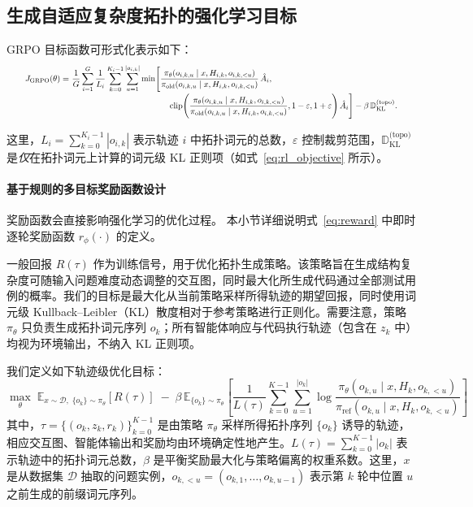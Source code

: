 \documentclass{article}
\theoremstyle{definition}
\begin{document}
\subsection{生成自适应复杂度拓扑的强化学习目标}
\label{appendix:rl_funs}
GRPO 目标函数可形式化表示如下：
\begin{equation}\label{eq:grpo_obj_fit}
\resizebox{0.95\linewidth}{!}{$
\begin{aligned}
J_{\mathrm{GRPO}}(\theta)=&\ \frac{1}{G}\sum_{i=1}^{G}\frac{1}{L_i}
\sum_{k=0}^{K_i-1}\sum_{u=1}^{|o_{i,k}|}
\min\!\Bigg[
\frac{\pi_\theta\!\left(o_{i,k,u}\mid x,H_{i,k},o_{i,k,<u}\right)}
     {\pi_{\text{old}}\!\left(o_{i,k,u}\mid x,H_{i,k},o_{i,k,<u}\right)}\,\hat A_i,\ 
\\[-2pt]
&\hspace{4.2cm}
\operatorname{clip}\!\Bigg(
\frac{\pi_\theta\!\left(o_{i,k,u}\mid x,H_{i,k},o_{i,k,<u}\right)}
     {\pi_{\text{old}}\!\left(o_{i,k,u}\mid x,H_{i,k},o_{i,k,<u}\right)},
1-\varepsilon,1+\varepsilon\Bigg)\,\hat A_i
\Bigg] 
-\beta\,\mathbb D_{\mathrm{KL}}^{\text{(topo)}}.
\end{aligned}
$}
\end{equation}

这里，$L_i=\sum_{k=0}^{K_i-1}|o_{i,k}|$ 表示轨迹 $i$ 中拓扑词元的总数，$\varepsilon$ 控制裁剪范围，$\mathbb D_{\mathrm{KL}}^{\text{(topo)}}$ 是\emph{仅}在拓扑词元上计算的词元级 KL 正则项（如式~\ref{eq:rl_objective} 所示）。
\paragraph{基于规则的多目标奖励函数设计}
奖励函数会直接影响强化学习的优化过程。
本小节详细说明式~\ref{eq:reward} 中即时逐轮奖励函数
\(r_\phi(\cdot)\) 的定义。

一般回报 $R(\tau)$ 作为训练信号，用于优化拓扑生成策略。该策略旨在生成结构复杂度可随输入问题难度动态调整的交互图，同时最大化所生成代码通过全部测试用例的概率。我们的目标是最大化从当前策略采样所得轨迹的期望回报，同时使用词元级 Kullback--Leibler（KL）散度相对于参考策略进行正则化。需要注意，策略 $\pi_\theta$ 只负责生成拓扑词元序列 $o_k$；所有智能体响应与代码执行轨迹（包含在 $z_k$ 中）均视为环境输出，不纳入 KL 正则项。

我们定义如下轨迹级优化目标：
\begin{equation}\label{eq:rl_objective}
\max_{\theta} \; \mathbb{E}_{x \sim \mathcal{D},\; \{o_k\} \sim \pi_\theta}\! \left[ R(\tau) \right] 
\; - \; \beta \, \mathbb{E}_{\{o_k\} \sim \pi_\theta}\! \left[ \frac{1}{L(\tau)} 
\sum_{k=0}^{K-1} \sum_{u=1}^{|o_k|} 
\log \frac{ \pi_\theta(o_{k,u} \mid x, H_k, o_{k,<u}) }{ \pi_{\mathrm{ref}}(o_{k,u} \mid x, H_k, o_{k,<u}) } \right]
\end{equation}
其中，$\tau = \{(o_k, z_k, r_k)\}_{k=0}^{K-1}$ 是由策略 $\pi_\theta$ 采样所得拓扑序列 $\{o_k\}$ 诱导的轨迹，相应交互图、智能体输出和奖励均由环境确定性地产生。$L(\tau) = \sum_{k=0}^{K-1} |o_k|$ 表示轨迹中的拓扑词元总数，$\beta$ 是平衡奖励最大化与策略偏离的权重系数。这里，$x$ 是从数据集 $\mathcal{D}$ 抽取的问题实例，$o_{k,<u} = (o_{k,1}, \ldots, o_{k,u-1})$ 表示第 $k$ 轮中位置 $u$ 之前生成的前缀词元序列。
\end{document}
